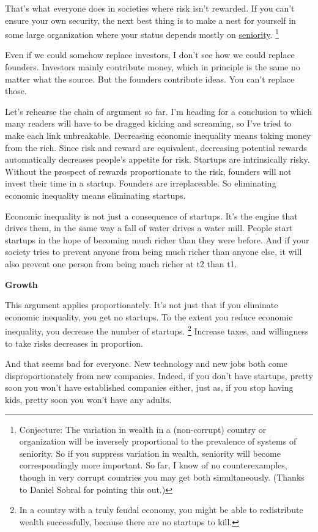 That's what everyone does in societies where risk isn't rewarded. If you
can't ensure your own security, the next best thing is to make a nest
for yourself in some large organization where your status depends mostly
on \href{ladder.html}{seniority}. \footnote{Conjecture: The variation in wealth in a (non-corrupt) country
or organization will be inversely proportional to the prevalence of
systems of seniority. So if you suppress variation in wealth, seniority
will become correspondingly more important. So far, I know of no
counterexamples, though in very corrupt countries you may get both
simultaneously. (Thanks to Daniel Sobral for pointing this out.)}

Even if we could somehow replace investors, I don't see how we could
replace founders. Investors mainly contribute money, which in principle
is the same no matter what the source. But the founders contribute
ideas. You can't replace those.

Let's rehearse the chain of argument so far. I'm heading for a
conclusion to which many readers will have to be dragged kicking and
screaming, so I've tried to make each link unbreakable. Decreasing
economic inequality means taking money from the rich. Since risk and
reward are equivalent, decreasing potential rewards automatically
decreases people's appetite for risk. Startups are intrinsically risky.
Without the prospect of rewards proportionate to the risk, founders will
not invest their time in a startup. Founders are irreplaceable. So
eliminating economic inequality means eliminating startups.

Economic inequality is not just a consequence of startups. It's the
engine that drives them, in the same way a fall of water drives a water
mill. People start startups in the hope of becoming much richer than
they were before. And if your society tries to prevent anyone from being
much richer than anyone else, it will also prevent one person from being
much richer at t2 than t1.

\textbf{Growth}

This argument applies proportionately. It's not just that if you
eliminate economic inequality, you get no startups. To the extent you
reduce economic inequality, you decrease the number of startups.
\footnote{In a country with a truly feudal economy, you might be able to
redistribute wealth successfully, because there are no startups to kill.} Increase taxes, and willingness to take risks
decreases in proportion.

And that seems bad for everyone. New technology and new jobs both come
disproportionately from new companies. Indeed, if you don't have
startups, pretty soon you won't have established companies either, just
as, if you stop having kids, pretty soon you won't have any adults.

